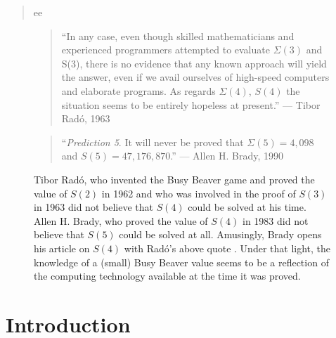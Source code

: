 \documentclass[a4paper,british]{article}
\theoremstyle{definition} %
\numberwithin{equation}{section}
\theoremstyle{definition} %
\newcommand{\BBtheFifth}{47{,}176{,}870}
\newcommand{\SigmaTheFifth}{4{,}098}
\newcommand{\radofull}{Tibor Rad\'o\xspace}
\newcommand{\rado}{Rad\'o\xspace}
\begin{document}
\date{}
\maketitle

\begin{abstract}
    ee
\end{abstract}


\setcounter{tocdepth}{2}
\tableofcontents
\newpage

\begin{center}

\end{center}



\begin{figure}
    \begin{quote}
        ``In any case, even though skilled mathematicians and experienced programmers attempted to evaluate $\Sigma(3)$ and S(3), there is no evidence that any known approach will yield the answer, even if we avail ourselves of high-speed computers and elaborate programs. As regards $\Sigma(4)$, $S(4)$ the situation seems to be entirely hopeless at present.'' --- \radofull, 1963 \cite{Rado_1963}
    \end{quote}
    \begin{quote}
        ``\textit{Prediction 5}. It will never be proved that $\Sigma(5) = \SigmaTheFifth$ and $S(5) = \BBtheFifth$.'' --- Allen H. Brady, 1990 \cite{BradyMeaningOfLife}
    \end{quote}
    \caption{\radofull, who invented the Busy Beaver game and proved the value of $S(2)$ in 1962 \cite{Rado_1962} and who was involved in the proof of $S(3)$ in 1963 \cite{Lin1963} did not believe that $S(4)$ could be solved at his time. Allen H. Brady, who proved the value of $S(4)$ in 1983 \cite{Brady83} did not believe that $S(5)$ could be solved at all. Amusingly, Brady opens his article on $S(4)$ with \rado's above quote \cite{Brady83}. Under that light, the knowledge of a (small) Busy Beaver value seems to be a reflection of the computing technology available at the time it was proved.}
\end{figure}

\section{Introduction}

\newcommand{\noncomput}{noncomputable\xspace}
\newcommand{\BBfull}{Busy Beaver\xspace}
\newcommand{\Coq}{Coq\xspace}
\newcommand{\CoqProofReleaseURL}{\url{https://github.com/ccz181078/Coq-BB5}}
\end{document}
